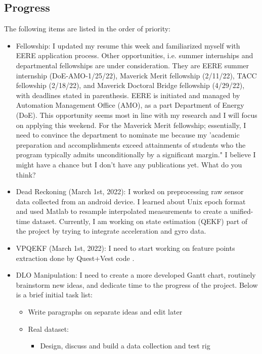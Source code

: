 \documentclass[11pt]{article}
\begin{document}
\begin{itemize}
\section{Progress}
The following items are listed in the order of priority:
\begin{itemize}
      \item Fellowship: I updated my resume this week and familiarized myself
      with EERE application process. Other opportunities, i.e. summer internships
      and departmental fellowships are under consideration. They are EERE summer
      internship (DoE-AMO-1/25/22), Maverick Merit fellowship (2/11/22), TACC
      fellowship (2/18/22), and Maverick Doctoral Bridge fellowship (4/29/22),
      with deadlines stated in parenthesis. EERE is initiated and managed by
      Automation Management Office (AMO), as a part Department of Energy (DoE).
      This opportunity seems most in line with my research and I will focus on
      applying this weekend. For the Maverick Merit fellowship; essentially,
      I need to convince the department to nominate me because my 'academic
      preparation and accomplishments exceed attainments of students who the
      program typically admits unconditionally by a significant margin." I
      believe I might have a chance but I don't have any publications yet. What
      do you think?
      \item Dead Reckoning (March 1st, 2022): I worked on preprocessing raw
      sensor data collected from an android device. I learned about Unix epoch
      format and used Matlab to resample interpolated measurements to create a
      unified-time dataset. Currently, I am working on state estimation (QEKF)
      part of the project by trying to integrate acceleration and gyro data.
      \item VPQEKF (March 1st, 2022): I need to start working on feature points
      extraction done by Quest+Vest code \cite{quest}.
      \item DLO Manipulation: I need to create a more developed Gantt chart,
      routinely brainstorm new ideas, and dedicate time to the progress of the
      project. Below is a brief initial task list:
      \begin{itemize}
            \item Write paragraphs on separate ideas and edit later
            \item Real dataset:
            \begin{itemize}
                  \item Design, discuss and build a data collection and test rig

\end{itemize}
\end{itemize}
\end{itemize}
\end{itemize}
\end{document}
